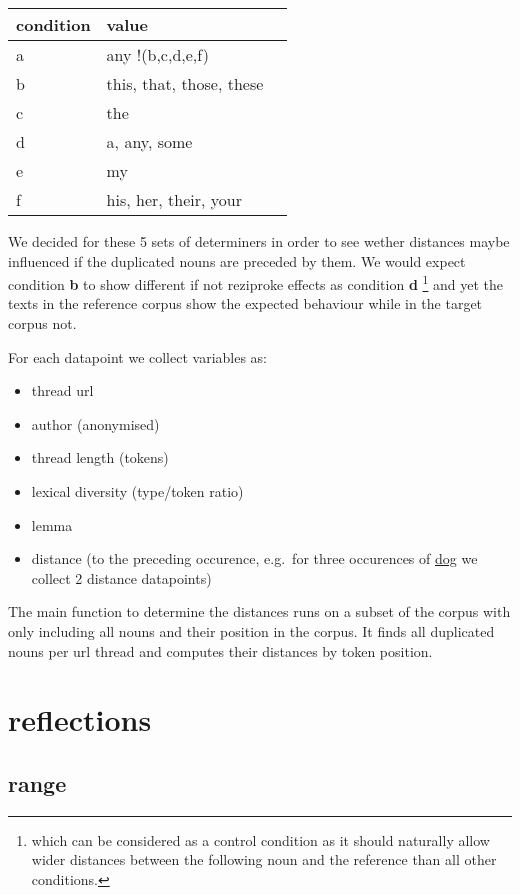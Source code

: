 \documentclass[
  12pt,
  oneside]{book}
\providecommand{\tightlist}{%
  \setlength{\itemsep}{0pt}\setlength{\parskip}{0pt}}
\begin{document}
\begin{longtable}[]{@{}lll@{}}
\toprule\noalign{}
condition & value & \\
\midrule\noalign{}
\endhead
\bottomrule\noalign{}
\endlastfoot
a & any !(b,c,d,e,f) & \\
b & this, that, those, these & \\
c & the & \\
d & a, any, some & \\
e & my & \\
f & his, her, their, your & \\
\end{longtable}

We decided for these 5 sets of determiners in order to see wether distances maybe influenced if the duplicated nouns are preceded by them. We would expect condition \textbf{b} to show different if not reziproke effects as condition \textbf{d} \footnote{which can be considered as a control condition as it should naturally allow wider distances between the following noun and the reference than all other conditions.} and yet the texts in the reference corpus show the expected behaviour while in the target corpus not.

For each datapoint we collect variables as:

\begin{itemize}
\tightlist
\item
  thread url
\item
  author (anonymised)
\item
  thread length (tokens)
\item
  lexical diversity (type/token ratio)
\item
  lemma
\item
  distance (to the preceding occurence, e.g.~for three occurences of \href{}{dog} we collect 2 distance datapoints)
\end{itemize}

The main function to determine the distances runs on a subset of the corpus with only including all nouns and their position in the corpus. It finds all duplicated nouns per url thread and computes their distances by token position.

\section{reflections}\label{reflections}

\subsection{range}\label{range}
\end{document}
